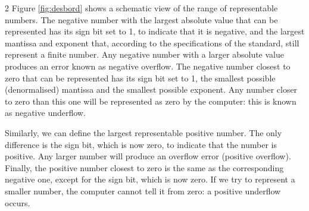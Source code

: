 \begin{paracol}{2}
Figure \ref{fig:desbord} shows a schematic view of the range of representable numbers. The negative number with the largest absolute value that can be represented has its sign bit set to 1, to indicate that it is negative, and the largest mantissa and exponent that, according to the specifications of the standard, still represent a finite number. Any negative number with a larger absolute value produces an error known as negative overflow. The negative number closest to zero that can be represented has its sign bit set to 1, the smallest possible (denormalised) mantissa and the smallest possible exponent. Any number closer to zero than this one will be represented as zero by the computer: this is known as negative underflow.

Similarly, we can define the largest representable positive number. The only difference is the sign bit, which is now zero, to indicate that the number is positive. Any larger number will produce an overflow error (positive overflow). Finally, the positive number closest to zero is the same as the corresponding negative one, except for the sign bit, which is now zero. If we try to represent a smaller number, the computer cannot tell it from zero: a positive underflow occurs.
\end{paracol}

